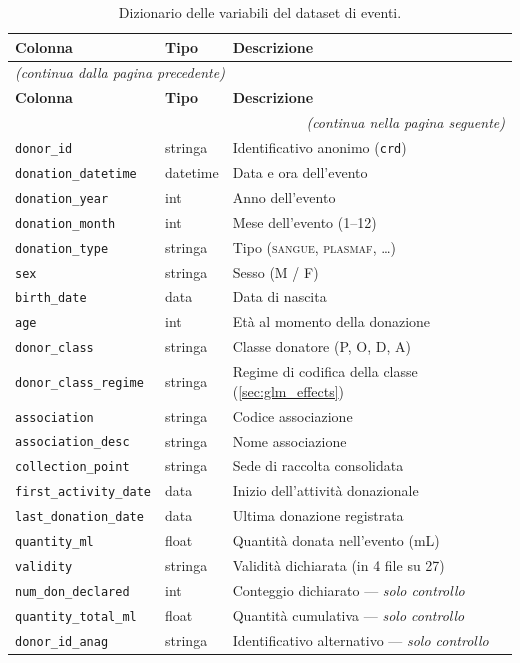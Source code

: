 \small
\setlength{\tabcolsep}{4pt}
\begin{longtable}{@{}llp{7.6cm}@{}}
\caption{Dizionario delle variabili del dataset di eventi.}
\label{tab:columns} \\
\toprule
\textbf{Colonna} & \textbf{Tipo} & \textbf{Descrizione} \\
\midrule
\endfirsthead
\multicolumn{3}{l}{\textit{(continua dalla pagina precedente)}} \\
\toprule
\textbf{Colonna} & \textbf{Tipo} & \textbf{Descrizione} \\
\midrule
\endhead
\midrule
\multicolumn{3}{r}{\textit{(continua nella pagina seguente)}} \\
\endfoot
\bottomrule
\endlastfoot
\texttt{donor\_id}             & stringa  & Identificativo anonimo (\texttt{crd}) \\
\texttt{donation\_datetime}    & datetime & Data e ora dell'evento \\
\texttt{donation\_year}        & int      & Anno dell'evento \\
\texttt{donation\_month}       & int      & Mese dell'evento (1--12) \\
\texttt{donation\_type}        & stringa  & Tipo (\textsc{sangue}, \textsc{plasmaf}, \ldots) \\
\texttt{sex}                   & stringa  & Sesso (M / F) \\
\texttt{birth\_date}           & data     & Data di nascita \\
\texttt{age}                   & int      & Età al momento della donazione \\
\texttt{donor\_class}          & stringa  & Classe donatore (P, O, D, A) \\
\texttt{donor\_class\_regime}  & stringa  & Regime di codifica della classe (\cref{sec:glm_effects}) \\
\texttt{association}           & stringa  & Codice associazione \\
\texttt{association\_desc}     & stringa  & Nome associazione \\
\texttt{collection\_point}     & stringa  & Sede di raccolta consolidata \\
\texttt{first\_activity\_date} & data     & Inizio dell'attività donazionale \\
\texttt{last\_donation\_date}  & data     & Ultima donazione registrata \\
\texttt{quantity\_ml}          & float    & Quantità donata nell'evento (mL) \\
\texttt{validity}              & stringa  & Validità dichiarata (in 4 file su 27) \\
\texttt{num\_don\_declared}    & int      & Conteggio dichiarato --- \emph{solo controllo} \\
\texttt{quantity\_total\_ml}   & float    & Quantità cumulativa --- \emph{solo controllo} \\
\texttt{donor\_id\_anag}       & stringa  & Identificativo alternativo --- \emph{solo controllo} \\
\end{longtable}

